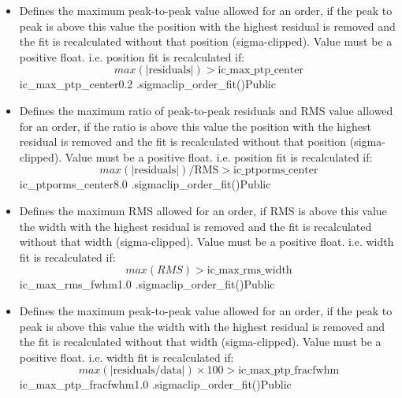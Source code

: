 \begin{itemize}
\item {}
{Defines the maximum peak-to-peak value allowed for an order, if the peak to peak is above this value the position with the highest residual is removed and the fit is recalculated without that position (sigma-clipped). Value must be a positive float.
\vspace{0.5cm}
i.e. position fit is recalculated if: 
\begin{equation}
max(|\text{residuals}|) > \text{ic\_max\_ptp\_center}
\end{equation}
}
{ic\_max\_ptp\_center}{0.2}
{\callocRAW}{\constantsfile}{\spirouLOCOR.sigmaclip\_order\_fit()}{Public}


\item {}
{Defines the maximum ratio of peak-to-peak residuals and RMS value allowed for an order, if the ratio is above this value the position with the highest residual is removed and the fit is recalculated without that position (sigma-clipped). Value must be a positive float.
\vspace{0.5cm}
i.e. position fit is recalculated if: 
\begin{equation}
max(|\text{residuals}|)/\text{RMS} > \text{ic\_ptporms\_center}
\end{equation}
}
{ic\_ptporms\_center}{8.0}
{\callocRAW}{\constantsfile}{\spirouLOCOR.sigmaclip\_order\_fit()}{Public}


\item {}
{Defines the maximum RMS allowed for an order, if RMS is above this value the width with the highest residual is removed and the fit is recalculated without that width (sigma-clipped). Value must be a positive float.
\vspace{0.5cm}
i.e. width fit is recalculated if: 
\begin{equation}
max(RMS) > \text{ic\_max\_rms\_width}
\end{equation}
}
{ic\_max\_rms\_fwhm}{1.0}
{\callocRAW}{\constantsfile}{\spirouLOCOR.sigmaclip\_order\_fit()}{Public}


\item {}
{Defines the maximum peak-to-peak value allowed for an order, if the peak to peak is above this value the width with the highest residual is removed and the fit is recalculated without that width (sigma-clipped). Value must be a positive float.
\vspace{0.5cm}
i.e. width fit is recalculated if: 
\begin{equation}
max(|\text{residuals/data}|)\times100 > \text{ic\_max\_ptp\_fracfwhm}
\end{equation}
}
{ic\_max\_ptp\_fracfwhm}{1.0}
{\callocRAW}{\constantsfile}{\spirouLOCOR.sigmaclip\_order\_fit()}{Public}



\end{itemize}
